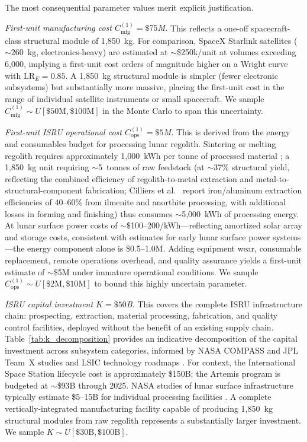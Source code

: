 \documentclass[preprint,12pt]{elsarticle}
\begin{document}
The most consequential parameter values merit explicit justification.

\emph{First-unit manufacturing cost $C_{\mathrm{mfg}}^{(1)} = \$75$M.} This reflects a one-off spacecraft-class structural module of 1{,}850~kg. For comparison, SpaceX Starlink satellites ($\sim$260~kg, electronics-heavy) are estimated at $\sim$\$250k/unit at volumes exceeding 6{,}000, implying a first-unit cost orders of magnitude higher on a Wright curve with $\mathrm{LR}_E = 0.85$. A 1{,}850~kg structural module is simpler (fewer electronic subsystems) but substantially more massive, placing the first-unit cost in the range of individual satellite instruments or small spacecraft. We sample $C_{\mathrm{mfg}}^{(1)} \sim U[\$50\text{M}, \$100\text{M}]$ in the Monte Carlo to span this uncertainty.

\emph{First-unit ISRU operational cost $C_{\mathrm{ops}}^{(1)} = \$5$M.} This is derived from the energy and consumables budget for processing lunar regolith. Sintering or melting regolith requires approximately 1{,}000~kWh per tonne of processed material \cite{cilliers2023}; a 1{,}850~kg unit requiring $\sim$5~tonnes of raw feedstock (at $\sim$37\% structural yield, reflecting the combined efficiency of regolith-to-metal extraction and metal-to-structural-component fabrication; Cilliers et al.\ \cite{cilliers2023} report iron/aluminum extraction efficiencies of 40--60\% from ilmenite and anorthite processing, with additional losses in forming and finishing) thus consumes $\sim$5{,}000~kWh of processing energy. At lunar surface power costs of $\sim$\$100--200/kWh---reflecting amortized solar array and storage costs, consistent with estimates for early lunar surface power systems \cite{sanders2015,lsic2021}---the energy component alone is \$0.5--1.0M. Adding equipment wear, consumable replacement, remote operations overhead, and quality assurance yields a first-unit estimate of $\sim$\$5M under immature operational conditions. We sample $C_{\mathrm{ops}}^{(1)} \sim U[\$2\text{M}, \$10\text{M}]$ to bound this highly uncertain parameter.

\emph{ISRU capital investment $K = \$50$B.} This covers the complete ISRU infrastructure chain: prospecting, extraction, material processing, fabrication, and quality control facilities, deployed without the benefit of an existing supply chain. Table~\ref{tab:k_decomposition} provides an indicative decomposition of the capital investment across subsystem categories, informed by NASA COMPASS and JPL Team~X studies \cite{sanders2015,nasa2015handbook} and LSIC technology roadmaps \cite{lsic2021}. For context, the International Space Station lifecycle cost is approximately \$150B; the Artemis program is budgeted at $\sim$\$93B through 2025. NASA studies of lunar surface infrastructure typically estimate \$5--15B for individual processing facilities \cite{sanders2015,nasa2015handbook}. A complete vertically-integrated manufacturing facility capable of producing 1{,}850~kg structural modules from raw regolith represents a substantially larger investment. We sample $K \sim U[\$30\text{B}, \$100\text{B}]$.
\end{document}
